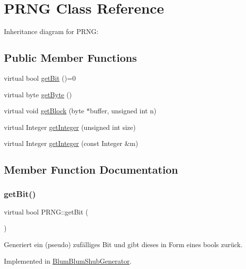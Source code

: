 \hypertarget{classPRNG}{}\section{P\+R\+NG Class Reference}
\label{classPRNG}


Inheritance diagram for P\+R\+NG\+:
\subsection*{Public Member Functions}
\begin{DoxyCompactItemize}
\item 
virtual bool \hyperlink{classPRNG_a513ec082275e805da358a2a790db2f9e}{get\+Bit} ()=0
\item 
virtual byte \hyperlink{classPRNG_aaef8a8a16c7a871a85262e26a19b9048}{get\+Byte} ()
\item 
virtual void \hyperlink{classPRNG_a1b48ca02baade80760485574d2a84644}{get\+Block} (byte $\ast$buffer, unsigned int n)
\item 
virtual Integer \hyperlink{classPRNG_aee67ebb332e0336b2dceefb6bba726db}{get\+Integer} (unsigned int size)
\item 
virtual Integer \hyperlink{classPRNG_af9eb9406a3ba8308447a125c1f24d7df}{get\+Integer} (const Integer \&m)
\end{DoxyCompactItemize}


\subsection{Member Function Documentation}
\mbox{\label{classPRNG_a513ec082275e805da358a2a790db2f9e}} 
\subsubsection{\texorpdfstring{get\+Bit()}{getBit()}}
{\footnotesize\ttfamily virtual bool P\+R\+N\+G\+::get\+Bit (\begin{DoxyParamCaption}{ }\end{DoxyParamCaption})\hspace{0.3cm}{\ttfamily [pure virtual]}}

Generiert ein (pseudo) zufälliges Bit und gibt dieses in Form eines bools zurück. 

Implemented in \hyperlink{classBlumBlumShubGenerator_aa25d1b6bc4686e6fecd254877b472d39}{Blum\+Blum\+Shub\+Generator}.

